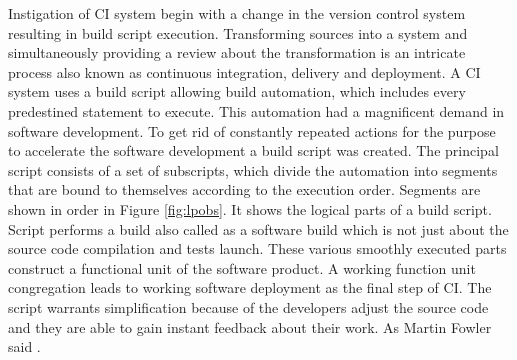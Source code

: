 Instigation of CI system begin with a change in the version control system resulting in build script execution. Transforming sources into a system and simultaneously providing a review about the transformation is an intricate process also known as continuous integration, delivery and deployment. A CI system uses a build script allowing build automation, which includes every predestined statement to execute. This automation had a magnificent demand in software development. To get rid of constantly repeated actions for the purpose to accelerate the software development a build script was created. The principal script consists of a set of subscripts, which divide the automation into segments that are bound to themselves according to the execution order. Segments are shown in order in Figure \ref{fig:lpobs}. It shows the logical parts of a build script. Script performs a build also called as a software build which is not just about the source code compilation and tests launch. These various smoothly executed parts construct a functional unit of the software product. A working function unit congregation leads to working software deployment as the final step of CI. The script warrants simplification because of the developers adjust the source code and they are able to gain instant feedback about their work. As Martin Fowler said  \cite{MartinFowler}.

